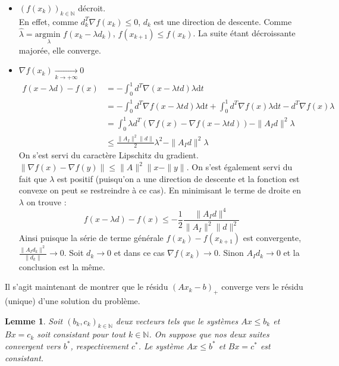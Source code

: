 \documentclass[10pt,a4paper]{article}
\newtheorem{lemma}{Lemme}
\begin{document}
\begin{itemize}
  \item $(f(x_k))_{k \in \mathbb{N}}$ décroit.\\
    En effet, comme $d_k^T \nabla f(x_k) \leq 0$, $d_k$ est une direction de descente.
    Comme $\widehat{\lambda} = \underset{\lambda}{\text{argmin }} f(x_k - \lambda d_k)$, $f(x_{k+1}) \leq f(x_k)$.
    La suite étant décroissante majorée, elle converge.
  \item $\nabla f(x_k) \underset{k \rightarrow +\infty}{\rightarrow} 0$\\ 
    \begin{equation}
      \begin{aligned}
        f(x-\lambda d) - f(x)
          &= -\int_0^1  d^T\nabla(x -\lambda  t d) \lambda \text{d}t \\
          &=-\int_0^1  d^T\nabla f(x -\lambda t d) \lambda \text{d}t + \int_0^1  d^T\nabla f(x) \lambda \text{d}t - d^T\nabla f(x) \lambda\\
          &=\int_0^1  \lambda d^T(\nabla f(x) - \nabla f(x -\lambda t d)) - \| A_I d \|^2 \lambda\\
          &\le \frac{\|A_I\|^2 \| d \|}{2} \lambda^2 - \| A_I d \|^2 \lambda
      \end{aligned}
    \end{equation}
    On s'est servi du caractère Lipschitz du gradient. $\| \nabla f(x) -\nabla f(y) \| \le \|A \|^2 \| x - \| y \|$.
    On s'est également servi du fait que $\lambda$ est positif (puisqu'on a une direction de descente et la fonction est convexe on peut se restreindre à ce cas).
    En minimisant le terme de droite en $\lambda$ on trouve :
    \begin{equation}
    f(x-\lambda d)-f(x) \le -\frac{1}{2}\frac{\| A_I d \|^4}{\|A_I \|^2 \|d \|^2}
    \end{equation}
    Ainsi puisque la série de terme générale $f(x_k)-f(x_{k+1})$ est convergente, $\frac{\| A_I d_k \|^2}{ \|d_k \|} \rightarrow 0$.
    Soit $d_k \rightarrow 0$ et dans ce cas $\nabla f (x_k) \rightarrow 0$.
    Sinon $A_I d_k \rightarrow 0$ et la conclusion est la même.\\
\end{itemize}

Il s'agit maintenant de montrer que le résidu $(Ax_k-b)_+$ converge vers le résidu (unique) d'une solution du problème.
\begin{lemma}
Soit $(b_k,c_k)_{k \in \mathbb{N}}$ deux vecteurs tels que le systèmes $Ax\le b_k$ et $Bx=c_k$ soit consistant pour tout $k \in \mathbb{N}$.
On suppose que nos deux suites convergent vers $b^*$, respectivement $c^*$.
Le système $Ax \le b^*$ et $Bx=c^*$ est consistant.
\end{lemma}
\end{document}
